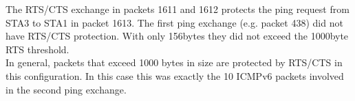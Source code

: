 The RTS/CTS exchange in packets 1611 and 1612 protects the ping request from STA3 to STA1 in packet 1613. The first ping exchange (e.g. packet 438) did not have RTS/CTS protection. With only 156bytes they did not exceed the 1000byte RTS threshold.\\
In general, packets that exceed 1000 bytes in size are protected by RTS/CTS in this configuration. In this case this was exactly the 10 ICMPv6 packets involved in the second ping exchange.
